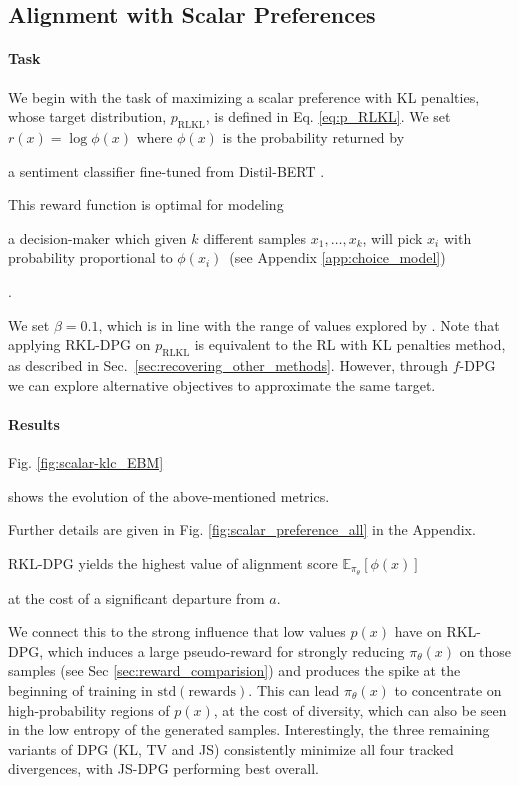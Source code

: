 \subsection{Alignment with Scalar Preference{s}}\label{sec:scalar}
\paragraph{Task} {We begin with the task of maximizing a scalar preference with KL penalties, whose target distribution, $p_\mathrm{RLKL}$, is defined in Eq. \ref{eq:p_RLKL}. We set} 
{$r(x)=\log \phi(x)$} where $\phi(x)$ is the probability {returned by}

a sentiment classifier fine-tuned from Distil-BERT \cite{hf_canonical_model_maintainers_2022}. {This reward function is optimal {for modeling}

a decision-maker which given $k$ different samples $x_1,\dots,x_k$, will pick $x_i$ with probability proportional to $\phi(x_i)$~(see Appendix \ref{app:choice_model})}. 

We set $\beta=0.1${, which is in line with the range of values explored by} \citet{ziegler2019fine}. 
Note that {applying} RKL-DPG {on $p_\mathrm{RLKL}$} 
is equivalent to the RL with KL penalties method, as described in Sec.~\ref{sec:recovering_other_methods}. However, {through $f$-DPG we can explore alternative objectives to approximate the same target.}  
\paragraph{Results} 
Fig. \ref{fig:scalar-klc_EBM} 

shows the evolution of {the above-mentioned metrics. }

Further details are given in Fig. \ref{fig:scalar_preference_all} in the Appendix. 

RKL-DPG yields the highest value of alignment score $\mathbb{E}_{\pi_\theta}[\phi(x)]$

at the cost of a significant departure from $a$.

{We connect this to the strong influence that low values $p(x)$ have on RKL{-DPG}, which induces a large pseudo-reward for strongly reducing ${\pi_\theta}(x)$ on those samples (see Sec \ref{sec:reward_comparision}) and produces the spike at the beginning of training in $\mathrm{std(rewards)}$. This can lead ${\pi_\theta}(x)$ to concentrate on high-probability regions of $p(x)$, at the cost of diversity, which can also be seen in {the} low entropy of the generated samples.} {Interestingly, the three remaining variants of DPG (KL, TV and JS) consistently minimize all four tracked divergences, with JS{-DPG} performing best overall.}

